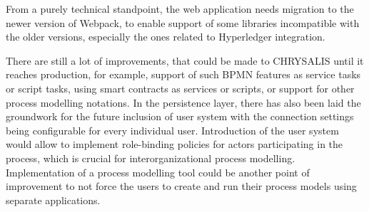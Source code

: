 From a purely technical standpoint, the web application needs migration to the newer version of Webpack, to enable support of some libraries incompatible with the older versions, especially the ones related to Hyperledger integration. 

There are still a lot of improvements, that could be made to CHRYSALIS until it reaches production, for example, support of such BPMN features as service tasks or script tasks, using smart contracts as services or scripts, or support for other process modelling notations. In the persistence layer, there has also been laid the groundwork for the future inclusion of user system with the connection settings being configurable for every individual user. Introduction of the user system would allow to implement role-binding policies for actors participating in the process, which is crucial for interorganizational process modelling.  Implementation of a process modelling tool could be another point of improvement to not force the users to create and run their process models using separate applications.